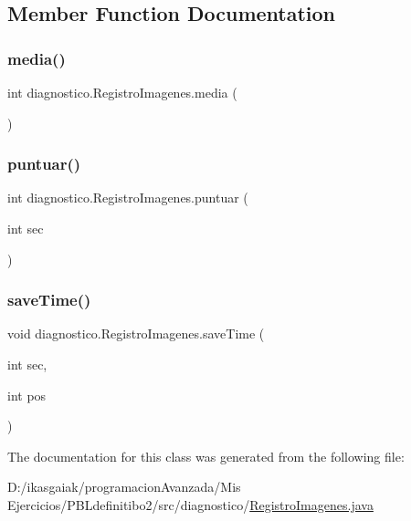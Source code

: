 \subsection{Member Function Documentation}
\mbox{\label{classdiagnostico_1_1_registro_imagenes_ab7a4a9b578e26dc7053f909cac2b174d}} 
\subsubsection{\texorpdfstring{media()}{media()}}
{\footnotesize\ttfamily int diagnostico.\+Registro\+Imagenes.\+media (\begin{DoxyParamCaption}{ }\end{DoxyParamCaption})}

\mbox{\label{classdiagnostico_1_1_registro_imagenes_a21db6380ac60fed3754c5de06199df68}} 
\subsubsection{\texorpdfstring{puntuar()}{puntuar()}}
{\footnotesize\ttfamily int diagnostico.\+Registro\+Imagenes.\+puntuar (\begin{DoxyParamCaption}\item[{int}]{sec }\end{DoxyParamCaption})}

\mbox{\label{classdiagnostico_1_1_registro_imagenes_a1a277de8844dcb424023de04d6723755}} 
\subsubsection{\texorpdfstring{save\+Time()}{saveTime()}}
{\footnotesize\ttfamily void diagnostico.\+Registro\+Imagenes.\+save\+Time (\begin{DoxyParamCaption}\item[{int}]{sec,  }\item[{int}]{pos }\end{DoxyParamCaption})}



The documentation for this class was generated from the following file\+:\begin{DoxyCompactItemize}
\item 
D\+:/ikasgaiak/programacion\+Avanzada/\+Mis Ejercicios/\+P\+B\+Ldefinitibo2/src/diagnostico/\mbox{\hyperlink{_registro_imagenes_8java}{Registro\+Imagenes.\+java}}\end{DoxyCompactItemize}
